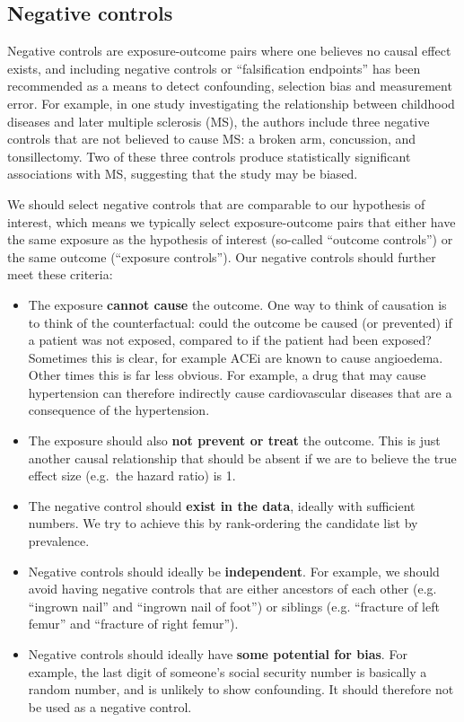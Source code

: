 \documentclass[11pt]{book}
\providecommand{\tightlist}{%
  \setlength{\itemsep}{0pt}\setlength{\parskip}{0pt}}
\begin{document}
\subsection{Negative controls}\label{NegativeControls}

Negative controls are exposure-outcome pairs where one believes no
causal effect exists, and including negative controls or ``falsification
endpoints'' \citep{prased_2013} has been recommended as a means to
detect confounding, \citep{lipsitch_2010} selection bias and measurement
error. \citep{arnold_2016} For example, in one study
\citep{zaadstra_2008} investigating the relationship between childhood
diseases and later multiple sclerosis (MS), the authors include three
negative controls that are not believed to cause MS: a broken arm,
concussion, and tonsillectomy. Two of these three controls produce
statistically significant associations with MS, suggesting that the
study may be biased.

We should select negative controls that are comparable to our hypothesis
of interest, which means we typically select exposure-outcome pairs that
either have the same exposure as the hypothesis of interest (so-called
``outcome controls'') or the same outcome (``exposure controls''). Our
negative controls should further meet these criteria:

\begin{itemize}
\tightlist
\item
  The exposure \textbf{cannot cause} the outcome. One way to think of
  causation is to think of the counterfactual: could the outcome be
  caused (or prevented) if a patient was not exposed, compared to if the
  patient had been exposed? Sometimes this is clear, for example ACEi
  are known to cause angioedema. Other times this is far less obvious.
  For example, a drug that may cause hypertension can therefore
  indirectly cause cardiovascular diseases that are a consequence of the
  hypertension.
\item
  The exposure should also \textbf{not prevent or treat} the outcome.
  This is just another causal relationship that should be absent if we
  are to believe the true effect size (e.g.~the hazard ratio) is 1.
\item
  The negative control should \textbf{exist in the data}, ideally with
  sufficient numbers. We try to achieve this by rank-ordering the
  candidate list by prevalence.
\item
  Negative controls should ideally be \textbf{independent}. For example,
  we should avoid having negative controls that are either ancestors of
  each other (e.g. ``ingrown nail'' and ``ingrown nail of foot'') or
  siblings (e.g. ``fracture of left femur'' and ``fracture of right
  femur'').
\item
  Negative controls should ideally have \textbf{some potential for
  bias}. For example, the last digit of someone's social security number
  is basically a random number, and is unlikely to show confounding. It
  should therefore not be used as a negative control.
\end{itemize}
\end{document}

